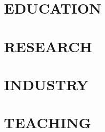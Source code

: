 \documentclass[margin, 10pt]{res} %
\begin{document}




\begin{resume}

\vspace{-1em}
\section{EDUCATION}


\vspace{-1.75em}
\section{RESEARCH}


\section{INDUSTRY}


\section{TEACHING}




\end{resume}
\end{document}
